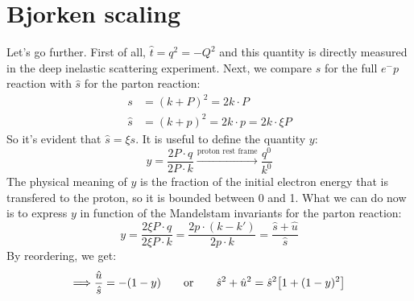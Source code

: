 \documentclass[../../main/main.tex]{subfiles}
\begin{document}

\section{Bjorken scaling}
Let's go further. First of all, \( \hat{t} = q^2 = - Q^2 \) and this quantity is directly measured in the deep inelastic scattering experiment. Next, we compare \( s \) for the full \( e^-p \) reaction with \( \hat{s} \) for the parton reaction:
\begin{align}
	s 		&= (k + P)^2 = 2 k \cdot P						\label{eq:L09_DISS}	\\
	\hat{s}	&= (k + p)^2 = 2 k \cdot p = 2 k \cdot \xi P	\label{eq:L09_DISSH}
\end{align}
So it's evident that \( \hat{s} = \xi s \). It is useful to define the quantity \( y \):
\begin{equation}
	y
	=
	\frac{2P \cdot q}{2P \cdot k}
	\xrightarrow{\text{proton rest frame}}
	\frac{q^0}{k^0}
	\label{eq:L09_DISYD}
\end{equation}
The physical meaning of \( y \) is the fraction of the initial electron energy that is transfered to the proton, so it is bounded between 0 and 1. What we can do now is to express \( y \) in function of the Mandelstam invariants for the parton reaction:
\begin{equation}
	y
	=
	\frac{2 \xi P \cdot q}{2 \xi P \cdot k}
	=
	\frac{2p \cdot (k - k')}{2p \cdot k}
	=
	\frac{\hat{s} + \hat{u}}{\hat{s}}
	\label{eq:L09_DISYMI}
\end{equation}
By reordering, we get:
\begin{equation}
	\Longrightarrow
	\frac{\hat{u}}{\hat{s}} = -(1-y)
	\qquad \text{or} \qquad
	\hat{s}^2 + \hat{u}^2 = \hat{s}^2 \qty[1 + (1-y)^2]
	\label{eq:L09_DISYMIE}
\end{equation}
\end{document}

